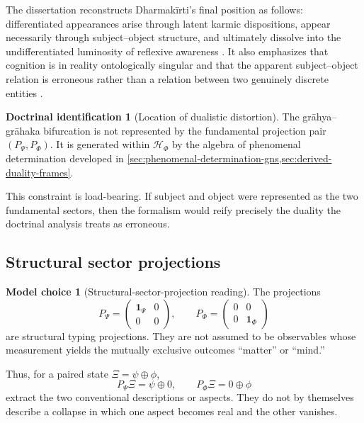 \documentclass[11pt,reqno]{scrartcl}
\newcommand{\scrHF}{\mathscr H_{\Phi}}
\newcommand{\PP}{P_{\Psi}}
\newcommand{\PF}{P_{\Phi}}
\newcommand{\idop}{\mathbf 1}
\theoremstyle{plain}
\theoremstyle{definition}
\newtheorem{identification}[identification]{Doctrinal identification}
\newtheorem{modelchoice}[modelchoice]{Model choice}
\theoremstyle{remark}
\begin{document}
The dissertation reconstructs Dharmak\=irti's final position as follows:
differentiated appearances arise through latent karmic dispositions, appear
necessarily through subject--object structure, and ultimately dissolve into
the undifferentiated luminosity of reflexive awareness
\cite[pp.~27--28]{Yiannopoulos2020}.  It also emphasizes that cognition is in
reality ontologically singular and that the apparent subject--object relation
is erroneous rather than a relation between two genuinely discrete entities
\cite[pp.~40--41]{Yiannopoulos2020}.

\begin{identification}[Location of dualistic distortion]
\label{id:duality-location}
The gr\=ahya--gr\=ahaka bifurcation is not represented by the fundamental
projection pair \((\PP,\PF)\).  It is generated within \(\scrHF\) by the
algebra of phenomenal determination developed in
\cref{sec:phenomenal-determination-gns,sec:derived-duality-frames}.
\end{identification}

This constraint is load-bearing.  If subject and object were represented as
the two fundamental sectors, then the formalism would reify precisely the
duality the doctrinal analysis treats as erroneous.

\subsection{Structural sector projections}

\begin{modelchoice}[Structural-sector-projection reading]
\label{choice:ssp}
The projections
\begin{equation}
  \PP=\begin{pmatrix}\idop_{\Psi}&0\\0&0\end{pmatrix},
  \qquad
  \PF=\begin{pmatrix}0&0\\0&\idop_{\Phi}\end{pmatrix}
  \label{eq:sector-projections}
\end{equation}
are structural typing projections.  They are not assumed to be observables
whose measurement yields the mutually exclusive outcomes ``matter'' or
``mind.''
\end{modelchoice}

Thus, for a paired state \(\Xi=\psi\oplus\phi\),
\begin{equation}
  \PP\Xi=\psi\oplus0,
  \qquad
  \PF\Xi=0\oplus\phi
\end{equation}
extract the two conventional descriptions or aspects.  They do not by
themselves describe a collapse in which one aspect becomes real and the other
vanishes.
\end{document}
